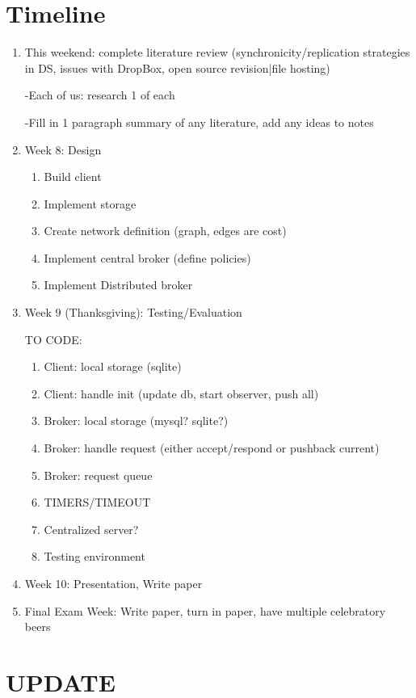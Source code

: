 \section{Timeline}
\begin{enumerate}
\item This weekend: complete literature review (synchronicity/replication strategies in DS, issues with DropBox, open source revision|file hosting)

-Each of us: research 1 of each

-Fill in 1 paragraph summary of any literature, add any ideas to notes

\item Week 8: Design
  \begin{enumerate}
    \item Build client
    \item Implement storage
    \item Create network definition (graph, edges are cost)
    \item Implement central broker (define policies)
    \item Implement Distributed broker
  \end{enumerate}
\item Week 9 (Thanksgiving): Testing/Evaluation
  
  TO CODE:
  \begin{enumerate}
    \item Client: local storage (sqlite)
    \item Client: handle init (update db, start observer, push all)
    \item Broker: local storage (mysql? sqlite?)
    \item Broker: handle request (either accept/respond or pushback current)
    \item Broker: request queue
    \item TIMERS/TIMEOUT
    \item Centralized server?
    \item Testing environment
  \end{enumerate}
\item Week 10: Presentation, Write paper
\item Final Exam Week: Write paper, turn in paper, have multiple celebratory beers
\end{enumerate}

\section{UPDATE}
